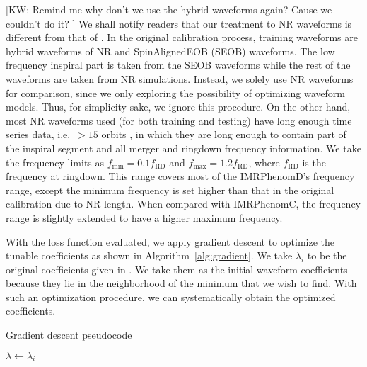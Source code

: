 \documentclass[twocolumn]{aastex631}
\newcommand{\kw}[1]{{\color{rb4}[KW: #1 ]}}
\begin{document}
\kw{Remind me why don't we use the hybrid waveforms again? Cause we couldn't do it?}
We shall notify readers that our treatment to NR waveforms is different from that of \citep{husa2016frequency, khan2016frequency}. In the original calibration process, training waveforms are hybrid waveforms of NR and SpinAlignedEOB
(SEOB) waveforms. The low frequency inspiral part is taken from the SEOB
waveforms while the rest of the waveforms are taken from NR simulations.
Instead, we solely use NR waveforms for comparison, since we only exploring the possibility of optimizing waveform models. Thus, for simplicity sake, we ignore this procedure. On the other hand, most NR waveforms used (for both training and testing) have long enough time series data, i.e.~$>15$ orbits \citep{boyle2019sxs}, in
which they are long enough to contain part of the inspiral segment and all
merger and ringdown frequency information. We take the frequency limits as
$f_{\mathrm{min}}=0.1f_{\mathrm{RD}}$ and $f_{\mathrm{max}}=1.2f_{\mathrm{RD}}$,
where $f_{\mathrm{RD}}$ is the frequency at ringdown. This range covers most of
the IMRPhenomD's frequency range, except the minimum frequency is set higher
than that in the original calibration due to NR length. When compared with
IMRPhenomC, the frequency range is slightly extended to have a higher maximum
frequency. 

With the loss function evaluated, we apply gradient descent to optimize the tunable
coefficients as shown in Algorithm~\ref{alg:gradient}. We take $\lambda_i$ to be the original coefficients given in \citep{khan2016frequency}. We take them as the initial waveform coefficients because they lie in the neighborhood of the minimum that we wish to find. With
such an optimization procedure, we can systematically obtain the optimized coefficients. 

\begin{algorithm}[t]
	\caption{Gradient descent pseudocode}
	\label{alg:gradient}
	    $\lambda\leftarrow\lambda_i$\\
	 \Return{$\lambda$}
\end{algorithm}
\end{document}
